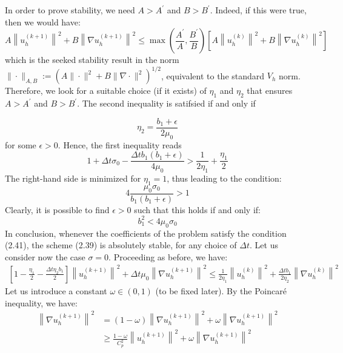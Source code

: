 \documentclass[11pt]{book}
\begin{document}
In order to prove stability, we need $A>A^{\prime}$ and $B>B^{\prime}$. Indeed, if this were true, then we would have:
$$
A\left\|u_{h}^{(k+1)}\right\|^{2}+B\left\|\nabla u_{h}^{(k+1)}\right\|^{2} \leq \max \left(\frac{A^{\prime}}{A}, \frac{B^{\prime}}{B}\right)\left[A\left\|u_{h}^{(k)}\right\|^{2}+B\left\|\nabla u_{h}^{(k)}\right\|^{2}\right]
$$
which is the seeked stability result in the norm
$\|\cdot\|_{A, B}:=\left(A\|\cdot\|^{2}+B\|\nabla \cdot\|^{2}\right)^{1 / 2}$, equivalent to the standard $V_{h}$ norm.
Therefore, we look for a suitable choice (if it exists) of $\eta_{1}$ and $\eta_{2}$ that
ensures $A>A^{\prime}$ and $B>B^{\prime}$. The second inequality is satifsied if and only if

$$
\eta_{2}=\frac{b_{1}+\epsilon}{2 \mu_{0}}
$$
for some $\epsilon>0$.
Hence, the first inequality reads
$$
1+\Delta t \sigma_{0}-\frac{\Delta t b_{1}\left(b_{1}+\epsilon\right)}{4 \mu_{0}}>\frac{1}{2 \eta_{1}}+\frac{\eta_{1}}{2}
$$
The right-hand side is minimized for $\eta_{1}=1$, thus leading to the condition:
\begin{equation}
4 \frac{\mu_{0} \sigma_{0}}{b_{1}\left(b_{1}+\epsilon\right)}>1
\end{equation}
Clearly, it is possible to find $\epsilon>0$ such that this holds if and only if:
\begin{equation}
b_{1}^{2}<4 \mu_{0} \sigma_{0}
\end{equation}
In conclusion, whenever the coefficients of the problem satisfy the condition (2.41), the scheme (2.39) is absolutely stable, for any choice of $\Delta t$.
Let us consider now the case $\sigma=0$. Proceeding as before, we have:
$$
\begin{gathered}
{\left[1-\frac{\eta_{1}}{2}-\frac{\Delta t \eta_{2} b_{1}}{2}\right]\left\|u_{h}^{(k+1)}\right\|^{2}+\Delta t \mu_{0}\left\|\nabla u_{h}^{(k+1)}\right\|^{2}} 
\leq \frac{1}{2 \eta_{1}}\left\|u_{h}^{(k)}\right\|^{2}+\frac{\Delta t b_{1}}{2 \eta_{2}}\left\|\nabla u_{h}^{(k)}\right\|^{2}
\end{gathered}
$$
Let us introduce a constant $\omega \in(0,1)$ (to be fixed later). By the Poincaré inequality, we have:
$$
\begin{aligned}
\left\|\nabla u_{h}^{(k+1)}\right\|^{2} & =(1-\omega)\left\|\nabla u_{h}^{(k+1)}\right\|^{2}+\omega\left\|\nabla u_{h}^{(k+1)}\right\|^{2} \\
& \geq \frac{1-\omega}{C_{p}^{2}}\left\|u_{h}^{(k+1)}\right\|^{2}+\omega\left\|\nabla u_{h}^{(k+1)}\right\|^{2}
\end{aligned}
$$
\end{document}
